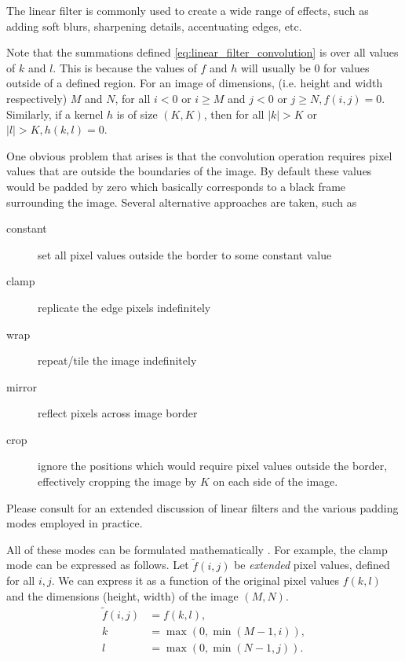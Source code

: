 \documentclass[11pt]{article} %
\theoremstyle{plain}
\theoremstyle{definition}
\theoremstyle{remark}
\begin{document}
The linear filter is commonly used to create a wide range of effects, 
such as adding  soft blurs, sharpening details, accentuating edges, etc.

Note that the summations defined \cref{eq:linear_filter_convolution} is over
all values of $k$ and $l$. This is because the values of $f$ and $h$ will usually
be 0 for values outside of a defined region. For an image of dimensions, (i.e.
height and width respectively) $M$ and $N$, for all $i<0$ or $i \geq M$ and $j<0$ 
or $j \geq N, f(i,j)=0$. Similarly, if a kernel $h$ is of size $(K, K)$, then for
all $|k|>K$ or $|l|>K, h(k,l)=0$.  

One obvious problem that arises is that the convolution operation requires 
pixel values that are outside the boundaries of the image. By default these
values would be padded by zero which basically corresponds to a black frame
surrounding the image. Several alternative approaches are taken, such 
as

\begin{description}
  \item[constant] set all pixel values outside the border to some constant value
  \item[clamp] replicate the edge pixels indefinitely
  \item[wrap] repeat/tile the image indefinitely
  \item[mirror] reflect pixels across image border
  \item[crop] ignore the positions which would require pixel values outside the border,
    effectively cropping the image by $K$ on each side of the image.
\end{description}

Please consult \citet[p.~111-115]{Szeliski2011} for an extended discussion
of linear filters and the various padding modes employed in practice. 

All of these modes can be formulated mathematically 
\cite[see][p.~114-115]{Szeliski2011}. For example, the clamp mode can be expressed 
as follows. Let $\tilde{f}(i, j)$ be \emph{extended} pixel values, defined for all 
$i, j$. We can express it as a function of the original pixel values $f(k, l)$ and the 
dimensions (height, width) of the image $(M, N)$.
\begin{align*}
  \tilde{f}(i, j) &= f(k, l), \\
  k               &= \max(0, \min(M-1, i)), \\
  l               &= \max(0, \min(N-1, j)).
\end{align*}
\end{document}
